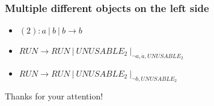     \begin{frame}[t]\frametitle{Multiple different objects on the left side}
      \begin{itemize}
        \item $(2): a\ |\ b\ |\ b \rightarrow b$
        \item $RUN \rightarrow RUN\ |\ UNUSABLE_2\ |_{\neg{a,\dot{a},UNUSABLE_2}}$
        \item $RUN \rightarrow RUN\ |\ UNUSABLE_2\ |_{\neg{b,UNUSABLE_2}}$
      \end{itemize}
    \end{frame}
    \note{}

    \begin{frame}[plain]
      \begin{center}
        Thanks for your attention!
      \end{center}
    \end{frame}

    \providecommand{\narrow}[1]{\scalebox{.8}[1.0]{#1}}




\newsavebox\mytempbib
\savebox\mytempbib{\parbox{\textwidth}{}}


